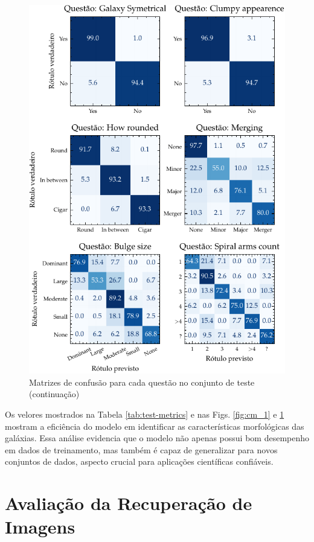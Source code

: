 \begin{figure}[!ht]
  \centering
  \caption{Matrizes de confusão para cada questão no conjunto de teste (continuação)}
  \label{fig:cm_2}
  \includegraphics[width=\linewidth]{notebooks/plots/cm_2.pdf}
\end{figure}


Os velores mostrados na Tabela \ref{tab:test-metrics} e nas Figs. \ref{fig:cm_1} e \ref{fig:cm_2} mostram a eficiência do modelo em identificar as características morfológicas das galáxias. Essa análise evidencia que o modelo não apenas possui bom desempenho em dados de treinamento, mas também é capaz de generalizar para novos conjuntos de dados, aspecto crucial para aplicações científicas confiáveis.




\section{Avaliação da Recuperação de Imagens}
\label{sec:res-ret}

